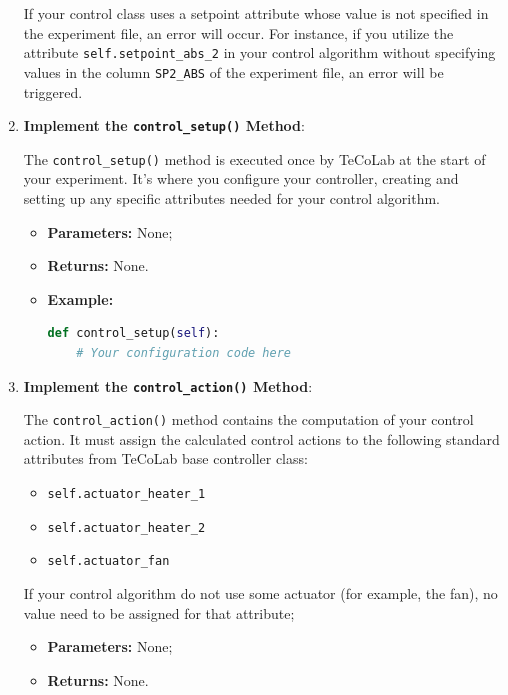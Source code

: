 \documentclass[12pt]{report}
\begin{document}
\begin{enumerate}
If your control class uses a setpoint attribute whose value is not specified in the experiment file, an error will occur. For instance, if you utilize the attribute \texttt{self.setpoint\_abs\_2} in your control algorithm without specifying values in the column \texttt{SP2\_ABS} of the experiment file, an error will be triggered.

\item \textbf{Implement the \texttt{control\_setup()} Method}:

The \texttt{control\_setup()} method is executed once by TeCoLab at the start of your experiment. It's where you configure your controller, creating and setting up any specific attributes needed for your control algorithm. 

\begin{itemize}

\item \textbf{Parameters:} None;

\item \textbf{Returns:} None.

\item \textbf{Example:}
\begin{lstlisting}[language = Python]
def control_setup(self):
    # Your configuration code here
\end{lstlisting}

\end{itemize}
\item \textbf{Implement the \texttt{control\_action()} Method}:

The \texttt{control\_action()} method contains the computation of your control action. It must assign the calculated control actions to the following standard attributes from TeCoLab base controller class:
\begin{itemize}
\item \texttt{self.actuator\_heater\_1}
\item \texttt{self.actuator\_heater\_2}
\item \texttt{self.actuator\_fan}
\end{itemize}

If your control algorithm do not use some actuator (for example, the fan), no value need to be assigned for that attribute;

\begin{itemize}

\item \textbf{Parameters:} None;

\item \textbf{Returns:} None.


\end{itemize}
\end{enumerate}
\end{document}
